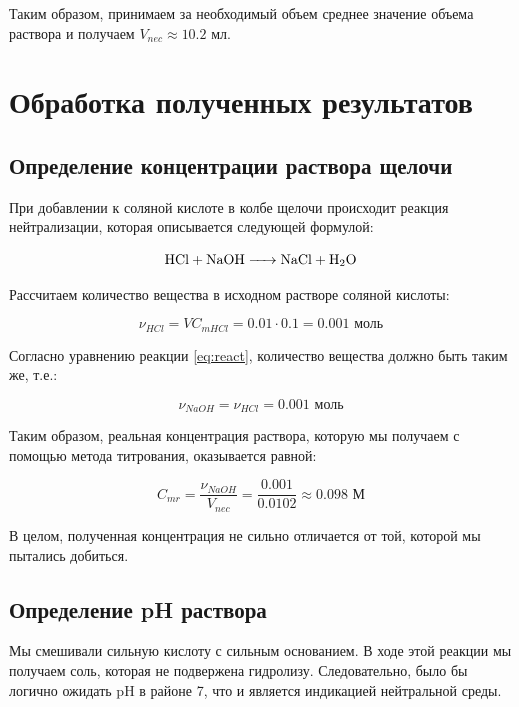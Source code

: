 \documentclass[a4paper, 12pt]{article}
\begin{document}
Таким образом, принимаем за необходимый объем среднее значение объема раствора и получаем $V_{nec} \approx 10.2$ мл.

\section{Обработка полученных результатов}

\subsection{Определение концентрации раствора щелочи}

При добавлении к соляной кислоте в колбе щелочи происходит реакция нейтрализации, которая описывается следующей формулой:

\begin{equation}
	\ce{HCl + NaOH -> NaCl + H2O}
	\label{eq:react}
\end{equation}

Рассчитаем количество вещества  в исходном растворе соляной кислоты:

\begin{equation}
		\nu_{HCl} = V C_{m HCl} = 0.01 \cdot 0.1 = 0.001 \text{ моль}
\end{equation}

Согласно уравнению реакции \ref{eq:react}, количество вещества  должно быть таким же, т.е.:

\begin{equation}
	\nu_{NaOH} = \nu_{HCl} = 0.001 \text{ моль}
\end{equation}

Таким образом, реальная концентрация раствора, которую мы получаем с помощью метода титрования, оказывается равной:

\begin{equation}
		\boxed{
		C_{mr} = \frac{\nu_{NaOH}}{V_{nec}} = \frac{0.001}{0.0102} \approx 0.098 \text{ М}
	}
\end{equation}

В целом, полученная концентрация не сильно отличается от той, которой мы пытались добиться.

\bigskip

\subsection{Определение pH раствора}

Мы смешивали сильную кислоту с сильным основанием. В ходе этой реакции мы получаем соль, которая не подвержена гидролизу. Следовательно, было бы логично ожидать pH в районе 7, что и является индикацией нейтральной среды.
\end{document}
